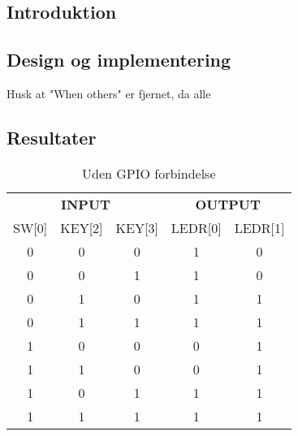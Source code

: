 \documentclass[../journal2.tex]{subfiles}
\begin{document}
\subsection{Introduktion}

\subsection{Design og implementering}

Husk at "When others" er fjernet, da alle 

\subsection{Resultater}

\begin{table}[!hbt]
    \begin{tabular}{ccc|cc}
    \multicolumn{3}{c}{\textbf{INPUT}}   &
    \multicolumn{2}{c}{\textbf{OUTPUT}} \\
    SW{[}0{]} & KEY{[}2{]} & KEY{[}3{]} & LEDR{[}0{]} & LEDR{[}1{]} \\ \hline
    0         & 0          & 0          & 1           & 0           \\
    0         & 0          & 1          & 1           & 0           \\
    0         & 1          & 0          & 1           & 1           \\
    0         & 1          & 1          & 1           & 1           \\
    1         & 0          & 0          & 0           & 1           \\
    1         & 1          & 0          & 0           & 1           \\
    1         & 0          & 1          & 1           & 1           \\
    1         & 1          & 1          & 1           & 1          
    \end{tabular}
    \centering
    \caption{Uden GPIO forbindelse}
\end{table}
\end{document}
